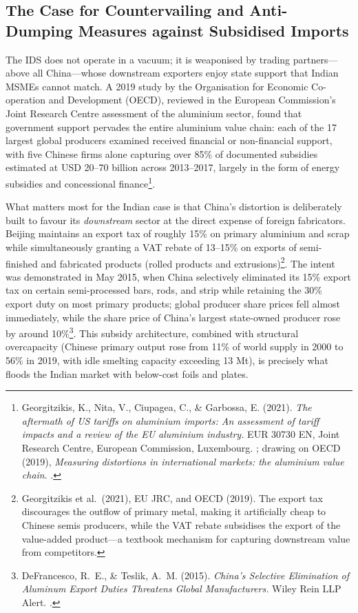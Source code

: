 \documentclass[11pt, a4paper]{article}
\numberwithin{figure}{section}
\numberwithin{table}{section}
\begin{document}
\subsection{The Case for Countervailing and Anti-Dumping Measures against Subsidised Imports}
The IDS does not operate in a vacuum; it is weaponised by trading partners—above all China—whose downstream exporters enjoy state support that Indian MSMEs cannot match. A 2019 study by the Organisation for Economic Co-operation and Development (OECD), reviewed in the European Commission's Joint Research Centre assessment of the aluminium sector, found that government support pervades the entire aluminium value chain: each of the 17 largest global producers examined received financial or non-financial support, with five Chinese firms alone capturing over 85\% of documented subsidies estimated at USD 20--70 billion across 2013--2017, largely in the form of energy subsidies and concessional finance\footnote{Georgitzikis, K., Nita, V., Ciupagea, C., \& Garbossa, E. (2021). \textit{The aftermath of US tariffs on aluminium imports: An assessment of tariff impacts and a review of the EU aluminium industry.} EUR 30730 EN, Joint Research Centre, European Commission, Luxembourg. \cite{jrc2021}; drawing on OECD (2019), \textit{Measuring distortions in international markets: the aluminium value chain}. \cite{oecd2019}.}.

What matters most for the Indian case is that China's distortion is deliberately built to favour its \textit{downstream} sector at the direct expense of foreign fabricators. Beijing maintains an export tax of roughly 15\% on primary aluminium and scrap while simultaneously granting a VAT rebate of 13--15\% on exports of semi-finished and fabricated products (rolled products and extrusions)\footnote{Georgitzikis et al.~(2021), EU JRC, and OECD (2019). The export tax discourages the outflow of primary metal, making it artificially cheap to Chinese semis producers, while the VAT rebate subsidises the export of the value-added product—a textbook mechanism for capturing downstream value from competitors.}. The intent was demonstrated in May 2015, when China selectively eliminated its 15\% export tax on certain semi-processed bars, rods, and strip while retaining the 30\% export duty on most primary products; global producer share prices fell almost immediately, while the share price of China's largest state-owned producer rose by around 10\%\footnote{DeFrancesco, R.~E., \& Teslik, A.~M. (2015). \textit{China's Selective Elimination of Aluminum Export Duties Threatens Global Manufacturers.} Wiley Rein LLP Alert. \cite{wiley2015}.}. This subsidy architecture, combined with structural overcapacity (Chinese primary output rose from 11\% of world supply in 2000 to 56\% in 2019, with idle smelting capacity exceeding 13 Mt), is precisely what floods the Indian market with below-cost foils and plates.
\end{document}

